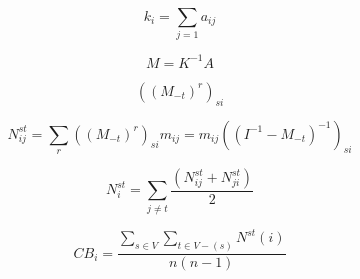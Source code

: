 
\begin{equation}
k_i = \sum_{j=1} a_{ij}
\end{equation}

\begin{equation}
M = K^{-1}A
\end{equation}

\begin{equation}
((M_{-t})^r)_{si}
\end{equation}

\begin{equation}
N_{ij}^{st} = \sum_r ((M_{-t})^r)_{si} m_{ij} = m_{ij}((I^{-1} - M_{-t})^{-1})_{si}
\end{equation}

\begin{equation}
N_i^{st} = \sum_{j \neq t} \frac{(N_{ij}^{st} + N_{ji}^{st})}{2}
\end{equation}

\begin{equation}
CB_i = \frac{\sum_{s \in V} \sum_{t \in V-(s)} N^{st}(i)}{n(n-1)}
\end{equation}
